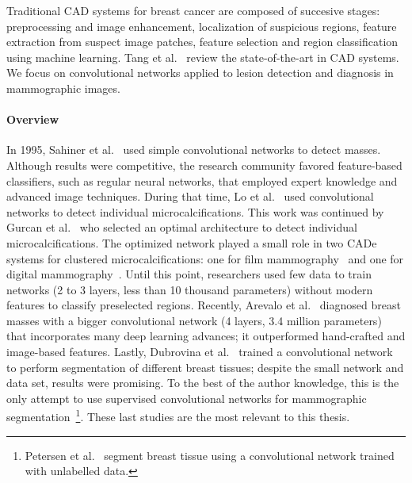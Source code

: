 Traditional CAD systems for breast cancer are composed of succesive stages: preprocessing and image enhancement, localization of suspicious regions, feature extraction from suspect image patches, feature selection and region classification using machine learning.
Tang et al.~\cite{Tang2009} review the state-of-the-art in CAD systems. We focus on convolutional networks applied to lesion detection and diagnosis in mammographic images.

\paragraph{Overview}
In 1995, Sahiner et al.~\cite{Sahiner1996} used simple convolutional networks to detect masses.
Although results were competitive, the research community favored feature-based classifiers, such as regular neural networks, that employed expert knowledge and advanced image techniques.
During that time, Lo et al.~\cite{Lo1995, Lo1998} used convolutional networks to detect individual microcalcifications.
This work was continued by Gurcan et al.~\cite{Gurcan2002} who selected an optimal architecture to detect individual microcalcifications. The optimized network played a small role in two CADe systems for clustered microcalcifications: one for film mammography~\cite{Gurcan2002} and one for digital mammography~\cite{Ge2006}.
Until this point, researchers used few data to train networks (2 to 3 layers, less than 10 thousand parameters) without modern features to classify preselected regions.
Recently, Arevalo et al.~\cite{Arevalo2016} diagnosed breast masses with a bigger convolutional network (4 layers, 3.4 million parameters) that incorporates many deep learning advances; it outperformed hand-crafted and image-based features.
Lastly, Dubrovina et al.~\cite{Dubrovina2015} trained a convolutional network to perform segmentation of different breast tissues; despite the small network and data set, results were promising.
To the best of the author knowledge, this is the only attempt to use supervised convolutional networks for mammographic segmentation~\footnote{Petersen et al.~\cite{Petersen2014} segment breast tissue using a convolutional network trained with unlabelled data.}. These last studies are the most relevant to this thesis.

